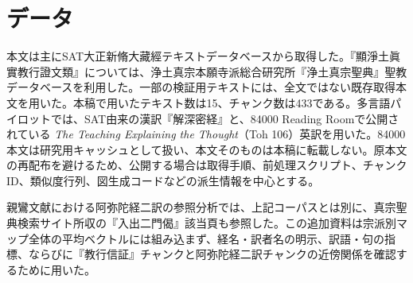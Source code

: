 \documentclass[uplatex,dvipdfmx,11pt,a4paper]{jsarticle}
\begin{document}
\section{データ}

本文は主にSAT大正新脩大藏經テキストデータベースから取得した。『顯淨土眞實教行證文類』については、浄土真宗本願寺派総合研究所『浄土真宗聖典』聖教データベースを利用した。一部の検証用テキストには、全文ではない既存取得本文を用いた。本稿で用いたテキスト数は15、チャンク数は433である。多言語パイロットでは、SAT由来の漢訳『解深密経』と、84000 Reading Roomで公開されている \textit{The Teaching Explaining the Thought}（Toh 106）英訳を用いた。84000本文は研究用キャッシュとして扱い、本文そのものは本稿に転載しない。原本文の再配布を避けるため、公開する場合は取得手順、前処理スクリプト、チャンクID、類似度行列、図生成コードなどの派生情報を中心とする。

親鸞文献における阿弥陀経二訳の参照分析では、上記コーパスとは別に、真宗聖典検索サイト所収の『入出二門偈』該当頁も参照した。この追加資料は宗派別マップ全体の平均ベクトルには組み込まず、経名・訳者名の明示、訳語・句の指標、ならびに『教行信証』チャンクと阿弥陀経二訳チャンクの近傍関係を確認するために用いた。
\end{document}
